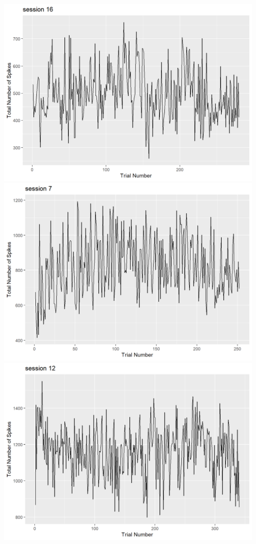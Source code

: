 \documentclass[
]{article}
\begin{document}
\includegraphics{images/unnamed-chunk-6-4.png}
\includegraphics{images/unnamed-chunk-6-5.png}
\includegraphics{images/unnamed-chunk-6-6.png}
\end{document}

